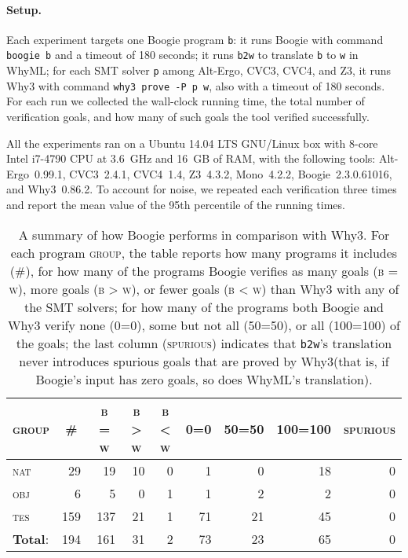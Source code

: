 \documentclass[a4paper,final]{llncs}
\makeatletter
\newif\iflong
\newcommand{\nat}{\textsc{nat}\xspace} \newcommand{\tes}{\textsc{tes}\xspace} \newcommand{\obj}{\textsc{obj}\xspace}
\newcommand{\btw}{\texttt{b2w}\xspace}
\newcommand{\Boogie}{Boogie\xspace}
\newcommand{\WhyML}{WhyML\xspace}
\newcommand{\Why}{Why3\xspace}
\newcommand{\tightParagraph}[1]{\paragraph{#1}}
\newcommand\tightParagraph{\@startsection{paragraph}{4}{\z@}{-5\p@ \@plus -4\p@ \@minus -4\p@}{-0.5em \@plus -0.22em \@minus -0.1em}{\normalfont\normalsize\itshape}}
\makeatother
\begin{document}
\tightParagraph{Setup.}
Each experiment targets one \Boogie program \verb|b|: it runs \Boogie with command \verb|boogie b| and a timeout of 180 seconds; it runs \btw to translate \verb|b| to \verb|w| in \WhyML; for each SMT solver \verb|p| among Alt-Ergo, CVC3, CVC4, and Z3, it runs \Why with command \verb|why3 prove -P p w|, also with a timeout of 180 seconds.\iflong\footnote{The timeouts were enforced using the Unix command \texttt{timeout}. We also set had a 20-second timeout per procedure (option \texttt{/timeLimit} in \Boogie) or goal (option \texttt{-T} in \Why).}\fi{} 
For each run we collected the wall-clock running time, the total number of verification goals, and how many of such goals the tool verified successfully.\iflong\footnote{The number of verification goals of each program is the same in \Boogie and \Why: the number of procedure implementations.}\fi 

All the experiments ran on a Ubuntu 14.04 LTS GNU/Linux box with 8-core Intel i7-4790 CPU at 3.6~GHz and 16~GB of RAM, with the following tools: Alt-Ergo~0.99.1, CVC3~2.4.1, CVC4~1.4, Z3~4.3.2, Mono~4.2.2, \iflong OCaml~4.02.3,\fi{} Boogie~2.3.0.61016, and Why3~0.86.2.
To account for noise, we repeated each verification three times and report 
the mean value of the 95th percentile 
of the running times.



\begin{table}
\centering
\scriptsize
\setlength{\tabcolsep}{4pt}
\begin{tabular}{l r |*{3}{r}|*{3}{r}|*{1}{r}}
\multicolumn{1}{c}{\textsc{group}} &
\multicolumn{1}{c}{\textsc{\#}} &
\multicolumn{1}{c}{\textsc{b = w}} &
\multicolumn{1}{c}{\textsc{b > w}} &
\multicolumn{1}{c}{\textsc{b < w}} &
\multicolumn{1}{c}{\textsc{0=0}} &
\multicolumn{1}{c}{\textsc{50=50}} &
\multicolumn{1}{c}{\textsc{100=100}} &
\multicolumn{1}{c}{\textsc{spurious}} 
\\
\hline
\nat  &  29  &  19  &  10  &  0  &  1  &  0  &  18  &  0
 \\
\obj  &  6  &  5  &  0  &  1  &  1  &  2  &  2  &  0
 \\
\tes  &  159  &  137  &  21  &  1  &  71  &  21  &  45  &  0
 \\
\hline
\textbf{Total}:  &  194  &  161  &  31  &  2  &  73  &  23  &  65  &  0
 \\
 \end{tabular}
\caption{A summary of how \Boogie performs in comparison with \Why. For each program \textsc{group}, the table reports
how many programs it includes (\textsc{\#}), 
for how many of the programs \Boogie verifies as many goals (\textsc{b = w}), more goals (\textsc{b > w}), or fewer goals (\textsc{b < w}) than \Why with any of the SMT solvers; 
for how many of the programs both \Boogie and \Why verify none (\textsc{0=0}), some but not all (\textsc{50=50}), or all (\textsc{100=100}) of the goals; 
the last column (\textsc{spurious}) indicates that \btw's translation never introduces spurious goals that are proved by \Why (that is, if \Boogie's input has zero goals, so does \WhyML's translation).}
\label{tab:programs-val}
\end{table}
\end{document}
